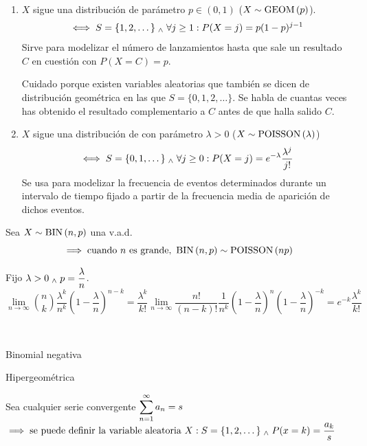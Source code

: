 \begin{ejem}
\begin{enumerate}
		\item $X$ sigue una distribución  de parámetro
		      $p\in(0,1)$ ($X\sim\operatorname{GEOM}\left(p\right)$).
		      \[\iff S=\{1, 2, \dots\} \; _{\wedge} \; \forall j \geq 1 : P(X=j)=p(1-p)^{j-1}\]
		      Sirve para modelizar el número de lanzamientos hasta que sale un resultado $C$
		      en cuestión con $P(X=C)=p$. \vspace{-0.3cm}
		      \begin{obs}
			      Cuidado porque existen variables aleatorias que también se dicen de distribución geométrica en las que $S=\{0, 1, 2, \dots\}$. Se habla de cuantas veces has obtenido el resultado complementario a $C$ antes de que halla salido $C$.
		      \end{obs}
		\item $X$ sigue una distribución de  con parámetro
		      $\lambda>0$ ($X\sim \operatorname{POISSON}\left(\lambda\right)$)
		      \[\iff S=\{0, 1, \dots\} \; _{\wedge} \; \forall j \geq 0 : P(X=j)=e^{-\lambda}\frac{\lambda^j}{j!}\]
		      Se usa para modelizar la frecuencia de eventos determinados durante un
		      intervalo de tiempo fijado a partir de la frecuencia media de aparición de
		      dichos eventos.
	\end{enumerate}
\end{ejem}

\begin{prop}
	Sea $X\sim \operatorname{BIN}\left(n, p\right)$ una v.a.d.
	\[\implies \text{cuando $n$ es grande, }\operatorname{BIN}\left(n, p\right)\sim\operatorname{POISSON}\left(np\right)\]
	\begin{dem}
		Fijo $\displaystyle\lambda>0 \; _{\wedge} \; p=\frac{\lambda}{n}$.
		\[\lim_{n\rightarrow\infty} \binom{n}{k}\frac{\lambda^k}{n^k}\left(1-\frac{\lambda}{n}\right)^{n-k}=\frac{\lambda^k}{k!}\lim_{n\rightarrow\infty} \frac{n!}{(n-k)!}\frac{1}{n^k}\left(1-\frac{\lambda}{n}\right)^n\left(1-\frac{\lambda}{n}\right)^{-k}=e^{-k}\frac{\lambda^k}{k!}\]

	\end{dem}
\end{prop}

\begin{ejem} \mbox{} \\
	\begin{itemize*}[itemjoin=\hspace{1cm}]
		\item Binomial negativa
		\item Hipergeométrica \\
		\item Sea cualquier serie convergente $\displaystyle \sum_{n=1}^\infty a_n = s$ \\
		      \mbox{} \hspace{1cm} $\displaystyle \implies \text{se puede definir la variable aleatoria } X : S=\{1, 2, \dots\} \; _{\wedge} \; P(x=k)=\frac{a_k}{s}$
	\end{itemize*}
\end{ejem}
\vspace{-1.25cm}
